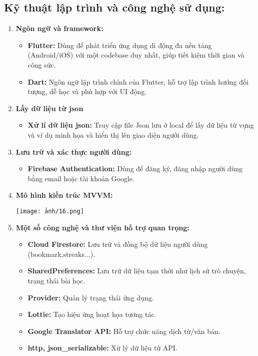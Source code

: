     \subsection{Kỹ thuật lập trình và công nghệ sử dụng:}
    \begin{enumerate}
   \item \textbf{Ngôn ngữ và framework:}
    \begin{itemize}
    \item \textbf{Flutter:} Dùng để phát triển ứng dụng di động đa nền tảng (Android/iOS) với một codebase duy nhất, giúp tiết kiệm thời gian và công sức.
    \item \textbf{Dart:} Ngôn ngữ lập trình chính của Flutter, hỗ trợ lập trình hướng đối tượng, dễ học và phù hợp với UI động.
    \end{itemize}

    \item \textbf{Lấy dữ liệu từ json}
    \begin{itemize}
    \item \textbf{Xử lí dữ liệu json:} Truy cập file Json lưu ở local để lấy dữ liệu từ vựng và ví dụ minh họa và hiển thị lên giao diện người dùng.
    
    \end{itemize}

    \item \textbf{Lưu trữ và xác thực người dùng:}
    \begin{itemize}
    \item \textbf{Firebase Authentication:} Dùng để đăng ký, đăng nhập người dùng bằng email hoặc tài khoản Google.
    \end{itemize}
\item \textbf{Mô hình kiến trúc MVVM:}

\begin{center}
\texttt{[image: ảnh/16.png]}
\end{center}


    \item \textbf{ Một số công nghệ và thư viện hỗ trợ quan trọng:}
    \begin{itemize}
    \item \textbf{Cloud Firestore: }Lưu trữ và đồng bộ dữ liệu người dùng (bookmark,streaks...).
    \item \textbf{SharedPreferences: }Lưu trữ dữ liệu tạm thời như lịch sử trò chuyện, trạng thái bài học.
    \item \textbf{Provider: }Quản lý trạng thái ứng dụng.
    \item \textbf{Lottie:}  Tạo hiệu ứng hoạt họa tương tác.
    \item \textbf{Google Translator API: }Hỗ trợ chức năng dịch từ/văn bản.
    \item \textbf{http, json_serializable: }Xử lý dữ liệu từ API.


    \end{itemize}
    \end{enumerate}
    

